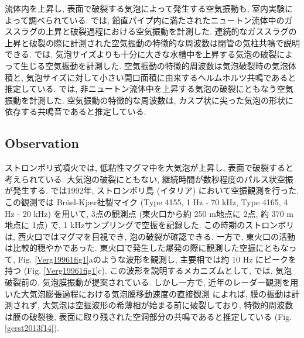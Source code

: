 \documentclass[12pt]{article}
\begin{document}
流体内を上昇し, 表面で破裂する気泡によって発生する空気振動も, 室内実験によって調べられている.
\cite{James2004}では, 鉛直パイプ内に満たされたニュートン流体中のガススラグの上昇と破裂過程における空気振動を計測した. 連続的なガススラグの上昇と破裂の際に計測された空気振動の特徴的な周波数は閉管の気柱共鳴で説明できる. 
\cite{Spiel1992}では, 気泡サイズよりも十分に大きな水槽中を上昇する気泡の破裂によって生じる空気振動を計測した. 空気振動の特徴的周波数は気泡破裂時の気泡体積と, 気泡サイズに対して小さい開口面積に由来するヘルムホルツ共鳴であると推定している.
\cite{Divoux2008}では, 非ニュートン流体中を上昇する気泡の破裂にともなう空気振動を計測した. 空気振動の特徴的な周波数は, カスプ状に尖った気泡の形状に依存する共鳴音であると推定している.


\subsection{Observation}\label{AcoinObs}

ストロンボリ式噴火では, 低粘性マグマ中を大気泡が上昇し, 表面で破裂すると考えられている. 大気泡の破裂にともない, 継続時間が数秒程度のパルス状空振が発生する. 
\cite{Vergniolle1996b} では1992年, ストロンボリ島 (イタリア) において空振観測を行った. この観測では Br\"uel-Kj\ae r社製マイク (Type 4155, 1 Hz - 70 kHz, Type 4165, 4 Hz - 20 kHz) を用いて, 3点の観測点 (東火口から約 250 m地点に 2点, 約 370 m地点に 1点) で, 1 kHzサンプリングで空振を記録した. 
この時期のストロンボリは, 西火口ではマグマを目視でき, 泡の破裂が確認できる. 一方で, 東火口の活動は比較的穏やかであった. 
東火口で発生した爆発の際に観測した空振にともなって, Fig. \ref{Verg19961fig1}aのような波形を観測し, 主要相では約 10 Hz にピークを持つ (Fig. \ref{Verg19961fig1}c). この波形を説明するメカニズムとして, \cite{Vergniolle1996c} では, 気泡破裂前の, 気泡膜振動が提案されている. 
しかし一方で, 近年のレーダー観測を用いた大気泡膨張過程における気泡膜移動速度の直接観測   \citep{Gerst2013a} によれば, 膜の振動は計測されず, 大気泡は空振波形の希薄相が始まる前に破裂しており, 特徴的周波数は膜の破裂後, 表面に取り残された空洞部分の共鳴であると推定している (Fig. \ref{gerst2013f14}).
\end{document}
